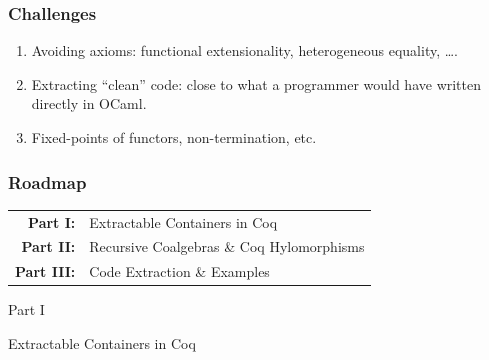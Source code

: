 \begin{frame}
  \frametitle{Challenges}
  \begin{enumerate}
    \item Avoiding axioms: functional extensionality, heterogeneous equality,
      \ldots.
    \item Extracting ``clean'' code: close to what a programmer would have
      written directly in OCaml.
    \item Fixed-points of functors, non-termination, etc.
  \end{enumerate}

  \vspace{.5cm}
  

\end{frame}


\begin{frame}
  \frametitle{Roadmap}
  \centering
  \LARGE

    \begin{sticky}%
      \vspace{-1.5em}
      \begin{tabular}{@{}rl}
        {\textbf{\color{gray}Part I:}} & Extractable Containers in Coq \\
        {\textbf{\color{gray}Part II:}} & Recursive Coalgebras \& Coq Hylomorphisms \\
        {\textbf{\color{gray}Part III:}} & Code Extraction \& Examples 
      \end{tabular}
    \end{sticky}
\end{frame}
% 
% 
% 
\begin{frame}
  \vfill
  \centering
  \begin{sticky}
    {\normalfont Part I}

    {\normalfont\Large Extractable Containers in Coq}
    \par%
  \end{sticky}
  \vfill
\end{frame}

